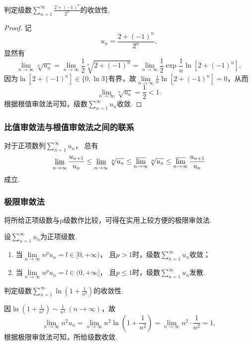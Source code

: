 \begin{example}
判定级数\(\sum\limits_{n=1}^\infty \frac{2+(-1)^n}{2^n}\)的收敛性.
\begin{proof}
记\[
u_n = \frac{2+(-1)^n}{2^n},
\]显然有\[
\lim\limits_{n\to\infty} \sqrt[n]{u_n}
= \lim\limits_{n\to\infty} \frac{1}{2} \sqrt[n]{2+(-1)^n}
= \lim\limits_{n\to\infty} \frac{1}{2} \exp{\frac{1}{n} \ln[2+(-1)^n]},
\]因为\(\ln[2+(-1)^n] \in \{ 0, \ln3 \}\)有界，故\(\lim\limits_{n\to\infty} \frac{1}{n} \ln[2+(-1)^n] = 0\)，从而\[
\lim\limits_{n\to\infty} \sqrt[n]{u_n} = \frac{1}{2} < 1.
\]根据根值审敛法可知，级数\(\sum\limits_{n=1}^\infty u_n\)收敛.
\end{proof}
\end{example}

\subsubsection{比值审敛法与根值审敛法之间的联系}
\begin{theorem}
对于正项数列\(\sum\limits_{n=1}^\infty u_n\)，
总有\[
	\varliminf\limits_{n\to\infty} \frac{u_{n+1}}{u_n}
	\leq
	\varliminf\limits_{n\to\infty} \sqrt[n]{u_n}
	\leq
	\varlimsup\limits_{n\to\infty} \sqrt[n]{u_n}
	\leq
	\varlimsup\limits_{n\to\infty} \frac{u_{n+1}}{u_n}
\]成立.
\end{theorem}

\subsubsection{极限审敛法}
将所给正项级数与p级数作比较，可得在实用上较方便的极限审敛法.
\begin{theorem}[极限审敛法]\label{theorem:无穷级数.正项级数的极限审敛法}
设\(\sum\limits_{n=1}^\infty u_n\)为正项级数.
\begin{enumerate}
	\item 当\(\lim\limits_{n\to\infty} n^p u_n = l\in[0,+\infty)\)，
	且\(p>1\)时，级数\(\sum\limits_{n=1}^\infty u_n\)收敛；
	\item 当\(\lim\limits_{n\to\infty} n^p u_n = l\in(0,+\infty]\)，
	且\(p\leq1\)时，级数\(\sum\limits_{n=1}^\infty u_n\)发散.
\end{enumerate}
\end{theorem}

\begin{example}
判定级数\(\sum\limits_{n=1}^\infty \ln(1+\frac{1}{n^2})\)的收敛性.
\begin{solution}
因\(\ln(1+\frac{1}{n^2}) \sim \frac{1}{n^2}\ (n\to\infty)\)，故\[
\lim\limits_{n\to\infty} n^2 u_n = \lim\limits_{n\to\infty} n^2 \ln(1+\frac{1}{n^2})
= \lim\limits_{n\to\infty} n^2 \cdot \frac{1}{n^2} = 1,
\]根据极限审敛法可知，所给级数收敛.
\end{solution}
\end{example}

